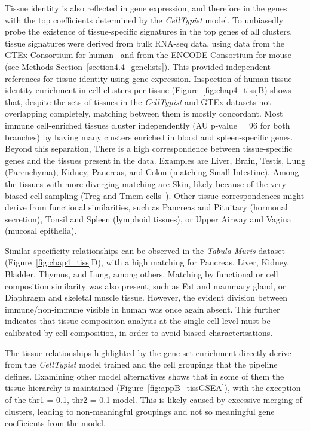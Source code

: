 Tissue identity is also reflected in gene expression, and therefore in the genes with the top coefficients determined by the \textit{CellTypist} model. To unbiasedly probe the existence of tissue-specific signatures in the top genes of all clusters, tissue signatures were derived from bulk RNA-seq data, using data from the GTEx Consortium for human~\citep{consortium_genotype-tissue_2015} and from the ENCODE Consortium for mouse~\citep{dunham_integrated_2012} (see Methods Section~\ref{section4.4_genelists}). This provided independent references for tissue identity using gene expression. Inspection of human tissue identity enrichment in cell clusters per tissue (Figure~\ref{fig:chap4_tiss}B) shows that, despite the sets of tissues in the \textit{CellTypist} and GTEx datasets not overlapping completely, matching between them is mostly concordant. Most immune cell-enriched tissues cluster independently (AU p-value = 96 for both branches) by having many clusters enriched in blood and spleen-specific genes. Beyond this separation, There is a high correspondence between tissue-specific genes and the tissues present in the data. Examples are Liver, Brain, Testis, Lung (Parenchyma), Kidney, Pancreas, and Colon (matching Small Intestine). Among the tissues with more diverging matching are Skin, likely because of the very biased cell sampling (Treg and Tmem cells~\citep{miragaia_single-cell_2019}). Other tissue correspondences might derive from functional similarities, such as Pancreas and Pituitary (hormonal secretion), Tonsil and Spleen (lymphoid tissues), or Upper Airway and Vagina (mucosal epithelia).

Similar specificity relationships can be observed in the \textit{Tabula Muris} dataset (Figure~\ref{fig:chap4_tiss}D), with a high matching for Pancreas, Liver, Kidney, Bladder, Thymus, and Lung, among others. Matching by functional or cell composition similarity was also present, such as Fat and mammary gland, or Diaphragm and skeletal muscle tissue. However, the evident division between immune/non-immune visible in human was once again absent. This further indicates that tissue composition analysis at the single-cell level must be calibrated by cell composition, in order to avoid biased characterisations.

The tissue relationships highlighted by the gene set enrichment directly derive from the \textit{CellTypist} model trained and the cell groupings that the pipeline defines. Examining other model alternatives shows that in some of them the tissue hierarchy is maintained (Figure~\ref{fig:appB_tissGSEA}), with the exception of the thr1 = 0.1, thr2 = 0.1 model. This is likely caused by excessive merging of clusters, leading to non-meaningful groupings and not so meaningful gene coefficients from the model.


